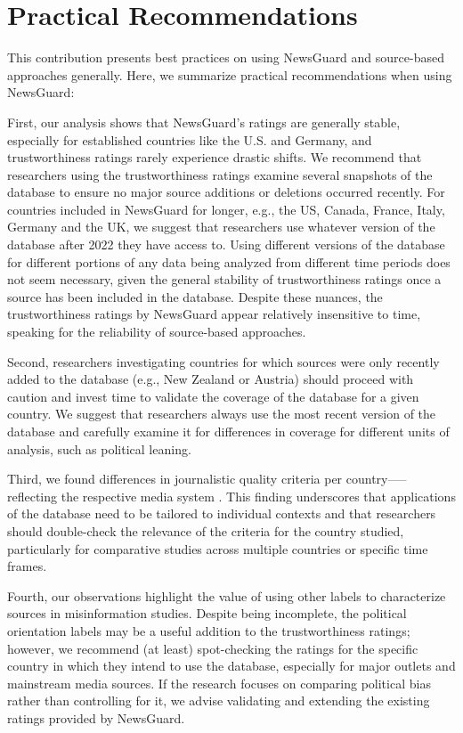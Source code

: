 \documentclass{article}
\begin{document}
\section{Practical Recommendations}
This contribution presents best practices on using NewsGuard and source-based approaches generally.
Here, we summarize practical recommendations when using NewsGuard:

First, our analysis shows that NewsGuard’s ratings are generally stable, especially for established countries like the U.S. and Germany, and trustworthiness ratings rarely experience drastic shifts.
We recommend that researchers using the trustworthiness ratings examine several snapshots of the database to ensure no major source additions or deletions occurred recently. 
For countries included in NewsGuard for longer, e.g., the US, Canada, France, Italy, Germany and the UK, we suggest that researchers use whatever version of the database after 2022 they have access to. 
Using different versions of the database for different portions of any data being analyzed from different time periods does not seem necessary, given the general stability of trustworthiness ratings once a source has been included in the database. 
Despite these nuances, the trustworthiness ratings by NewsGuard appear relatively insensitive to time, speaking for the reliability of source-based approaches.

Second, researchers investigating countries for which sources were only recently added to the database (e.g., New Zealand or Austria) should proceed with caution and invest time to validate the coverage of the database for a given country.
We suggest that researchers always use the most recent version of the database and carefully examine it for differences in coverage for different units of analysis, such as political leaning.

Third, we found differences in journalistic quality criteria per country–––reflecting the respective media system \citep{bruggemannHallinManciniRevisited2014b, hallinComparingMediaSystems2004}.
This finding underscores that applications of the database need to be tailored to individual contexts and that researchers should double-check the relevance of the criteria for the country studied, particularly for comparative studies across multiple countries or specific time frames.

Fourth, our observations highlight the value of using other labels to characterize sources in misinformation studies.
Despite being incomplete, the political orientation labels may be a useful addition to the trustworthiness ratings; however, we recommend (at least) spot-checking the ratings for the specific country in which they intend to use the database, especially for major outlets and mainstream media sources. 
If the research focuses on comparing political bias rather than controlling for it, we advise validating and extending the existing ratings provided by NewsGuard.
\end{document}
